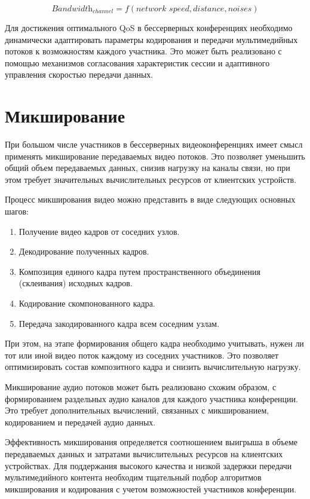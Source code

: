 \begin{equation}
  \textit{Bandwidth}_{channel}=f(\textit{network~speed},\textit{distance},\textit{noises})
\end{equation}

Для достижения оптимального QoS в бессерверных конференциях необходимо динамически адаптировать параметры кодирования и передачи мультимедийных потоков к возможностям каждого участника. Это может быть реализовано с помощью механизмов согласования характеристик сессии и адаптивного управления скоростью передачи данных.

\section{Микширование}

При большом числе участников в бессерверных видеоконференциях имеет смысл применять микширование передаваемых видео потоков. Это позволяет уменьшить общий объем передаваемых данных, снизив нагрузку на каналы связи, но при этом требует значительных вычислительных ресурсов от клиентских устройств.

Процесс микширования видео можно представить в виде следующих основных шагов:

\begin{enumerate}
\item Получение видео кадров от соседних узлов.
\item Декодирование полученных кадров.
\item Композиция единого кадра путем пространственного объединения (склеивания) исходных кадров.
\item Кодирование скомпонованного кадра.
\item Передача закодированного кадра всем соседним узлам.
\end{enumerate}

При этом, на этапе формирования общего кадра необходимо учитывать, нужен ли тот или иной видео поток каждому из соседних участников. Это позволяет оптимизировать состав композитного кадра и снизить вычислительную нагрузку.

Микширование аудио потоков может быть реализовано схожим образом, с формированием раздельных аудио каналов для каждого участника конференции. Это требует дополнительных вычислений, связанных с микшированием, кодированием и передачей аудио данных.

Эффективность микширования определяется соотношением выигрыша в объеме передаваемых данных и затратами вычислительных ресурсов на клиентских устройствах. Для поддержания высокого качества и низкой задержки передачи мультимедийного контента необходим тщательный подбор алгоритмов микширования и кодирования с учетом возможностей участников конференции.

